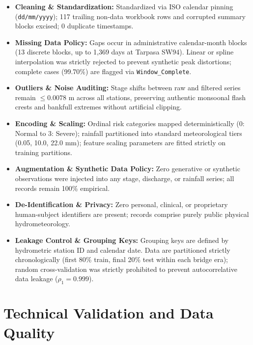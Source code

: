 \documentclass[11pt,a4paper]{article}
\begin{document}
\begin{itemize}[leftmargin=18pt,itemsep=2pt]
  \item \textbf{Cleaning \& Standardization:} Standardized via ISO calendar pinning (\texttt{dd/mm/yyyy}); 117 trailing non-data workbook rows and corrupted summary blocks excised; 0 duplicate timestamps.
  \item \textbf{Missing Data Policy:} Gaps occur in administrative calendar-month blocks (13 discrete blocks, up to 1,369 days at Tarpasa SW94). Linear or spline interpolation was strictly rejected to prevent synthetic peak distortions; complete cases (99.70\%) are flagged via \texttt{Window\_Complete}.
  \item \textbf{Outliers \& Noise Auditing:} Stage shifts between raw and filtered series remain $\le 0.0078\text{ m}$ across all stations, preserving authentic monsoonal flash crests and bankfull extremes without artificial clipping.
  \item \textbf{Encoding \& Scaling:} Ordinal risk categories mapped deterministically (0: Normal to 3: Severe); rainfall partitioned into standard meteorological tiers (0.05, 10.0, 22.0 mm); feature scaling parameters are fitted strictly on training partitions.
  \item \textbf{Augmentation \& Synthetic Data Policy:} Zero generative or synthetic observations were injected into any stage, discharge, or rainfall series; all records remain 100\% empirical.
  \item \textbf{De-Identification \& Privacy:} Zero personal, clinical, or proprietary human-subject identifiers are present; records comprise purely public physical hydrometeorology.
  \item \textbf{Leakage Control \& Grouping Keys:} Grouping keys are defined by hydrometric station ID and calendar date. Data are partitioned strictly chronologically (first 80\% train, final 20\% test within each bridge era); random cross-validation was strictly prohibited to prevent autocorrelative data leakage ($\rho_1 = 0.999$).
\end{itemize}

\section{Technical Validation and Data Quality}
\end{document}
